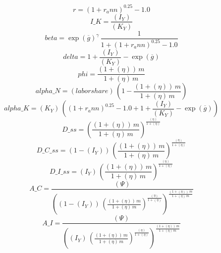 \begin{dmath*}
r = \left(1+{{r_ann}}\right)^{0.25}-1.0
\end{dmath*}
\begin{dmath*}
I\_K = \frac{{(I_Y)}}{{(K_Y)}}
\end{dmath*}
\begin{dmath*}
beta = \exp\left({{\overline{g}}}\right)^{{{\gamma}}}\, \frac{1}{1+\left(1+{{r_ann}}\right)^{0.25}-1.0}
\end{dmath*}
\begin{dmath*}
delta = 1+\frac{{(I_Y)}}{{(K_Y)}}-\exp\left({{\overline{g}}}\right)
\end{dmath*}
\begin{dmath*}
phi = \frac{\left(1+{(\eta)}\right)\, {{m}}}{1+{(\eta)}\, {{m}}}
\end{dmath*}
\begin{dmath*}
alpha\_N = {(labor share)}\, \left(1-\frac{\left(1+{(\eta)}\right)\, {{m}}}{1+{(\eta)}\, {{m}}}\right)
\end{dmath*}
\begin{dmath*}
alpha\_K = {(K_Y)}\, \left(\left(1+{{r_ann}}\right)^{0.25}-1.0+1+\frac{{(I_Y)}}{{(K_Y)}}-\exp\left({{\overline{g}}}\right)\right)
\end{dmath*}
\begin{dmath*}
D\_ss = \left(\frac{\left(1+{(\eta)}\right)\, {{m}}}{1+{(\eta)}\, {{m}}}\right)^{\frac{{(\eta)}}{1+{(\eta)}}}
\end{dmath*}
\begin{dmath*}
D\_C\_ss = \left(1-{(I_Y)}\right)\, \left(\frac{\left(1+{(\eta)}\right)\, {{m}}}{1+{(\eta)}\, {{m}}}\right)^{\frac{{(\eta)}}{1+{(\eta)}}}
\end{dmath*}
\begin{dmath*}
D\_I\_ss = {(I_Y)}\, \left(\frac{\left(1+{(\eta)}\right)\, {{m}}}{1+{(\eta)}\, {{m}}}\right)^{\frac{{(\eta)}}{1+{(\eta)}}}
\end{dmath*}
\begin{dmath*}
A\_C = \frac{{(\Psi)}}{\left(\left(1-{(I_Y)}\right)\, \left(\frac{\left(1+{(\eta)}\right)\, {{m}}}{1+{(\eta)}\, {{m}}}\right)^{\frac{{(\eta)}}{1+{(\eta)}}}\right)^{\frac{\left(1+{(\eta)}\right)\, {{m}}}{1+{(\eta)}\, {{m}}}}}
\end{dmath*}
\begin{dmath*}
A\_I = \frac{{(\Psi)}}{\left({(I_Y)}\, \left(\frac{\left(1+{(\eta)}\right)\, {{m}}}{1+{(\eta)}\, {{m}}}\right)^{\frac{{(\eta)}}{1+{(\eta)}}}\right)^{\frac{\left(1+{(\eta)}\right)\, {{m}}}{1+{(\eta)}\, {{m}}}}}
\end{dmath*}
